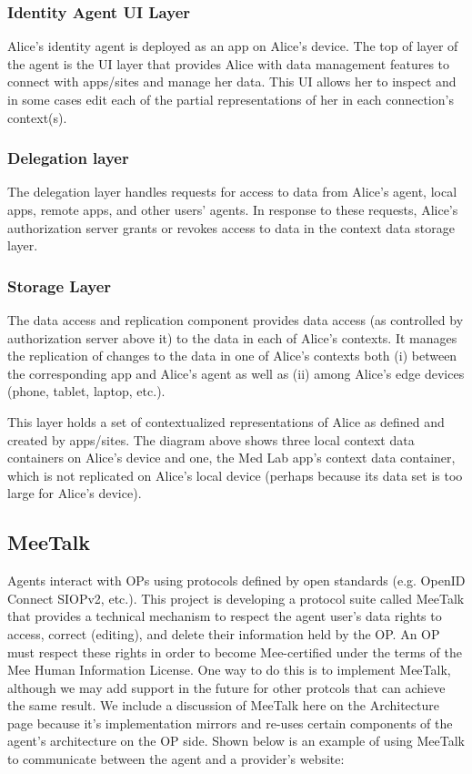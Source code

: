 \documentclass[11pt, oneside]{article}   	%
\begin{document}
\subsubsection{Identity Agent UI Layer}

Alice's identity agent is deployed as an app on Alice's device. The top of layer of the agent is the UI layer that provides Alice with data management features to connect with apps/sites and manage her data. This UI allows her to inspect and in some cases edit each of the partial representations of her in each connection's context(s). 

\subsubsection{Delegation layer}

The delegation layer handles requests for access to data from Alice's agent, local apps, remote apps, and other users' agents. In response to these requests, Alice's authorization server grants or revokes access to data in the context data storage layer. 

\subsubsection{Storage Layer}

The data access and replication component provides data access (as controlled by authorization server above it) to the data in each of Alice's contexts. It manages the replication of changes to the data in one of Alice's contexts both (i) between the corresponding app and Alice's agent as well as (ii) among Alice's edge devices (phone, tablet, laptop, etc.).

This layer holds a set of contextualized representations of Alice as defined and created by apps/sites. The diagram above shows three local context data containers on Alice's device and one, the Med Lab app's context data container, which is not replicated on Alice's local device (perhaps because its data set is too large for Alice's device).

\subsection{MeeTalk}

Agents interact with OPs using protocols defined by open standards (e.g. OpenID Connect SIOPv2, etc.). This project is developing a protocol suite called MeeTalk that provides a technical mechanism to respect the agent user's data rights to access, correct (editing), and delete their information held by the OP. An OP must respect these rights in order to become Mee-certified under the terms of the Mee Human Information License. One way to do this is to implement MeeTalk, although we may add support in the future for other protcols that can achieve the same result. We include a discussion of MeeTalk here on the Architecture page because it's implementation mirrors and re-uses certain components of the agent's architecture on the OP side. Shown below is an example of using MeeTalk to communicate between the agent and a provider's website:
\end{document}
